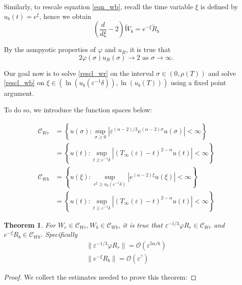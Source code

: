 \documentclass[letterpaper,11pt]{article}
\newcommand{\rmO}{\mathcal{O}}
\newcommand{\eps}{\varepsilon}
\numberwithin{equation}{section}
\theoremstyle{plain}
\newtheorem{theorem}{Theorem}[section]
\begin{document}
\begin{itemize}
Similarly, to rescale equation \eqref{eqn_wb}, recall the time variable $\xi$ is defined by $u_b(t) = e^\xi$, hence we obtain
\begin{equation}\label{rescl_wb}
\left(\frac{d}{d\xi} - 2\right) \tilde{W}_b =e^{-\xi} \tilde{R}_b
\end{equation}


By the asmpyotic properties of $\varphi$ and $u_R$, it is true that
\[
2\varphi(\sigma)u_R(\sigma) \to  2 \text{ as }\sigma \to \infty.
\]

Our goal now is to solve \eqref{rescl_wr} on the interval $\sigma \in (0, \rho(T))$ and solve \eqref{rescl_wb} on $\xi \in (\ln(u_b(\eps^{-1}\delta)), \ln(u_b(T)) )$ using a fixed point argument. 

To do so, we introduce the function spaces below:

\begin{align*}
\mathcal{C}_{Wr} &= \left\{ u(\sigma) : \sup_{\sigma\ge 0} \left|\eps^{(\alpha-2)/3} e^{(\alpha-2)\sigma}u(\sigma)\right| < \infty \right\} \\
&= \left\{ u(t) :\sup_{t \ge \eps^{-1}\delta} \left| (T_\infty(\eps)-t)^{2-\alpha}u(t)\right|<\infty
\right\} \\
\mathcal{C}_{Wb} &= \left\{ u(\xi) : \sup_{e^\xi\ge u_b(\eps^{-1}\delta)} \left| e^{(\alpha-2)\xi}u(\xi)\right| < \infty \right\} \\
 &= \left\{ u(t) : \sup_{t\ge \eps^{-1}\delta} \left| (T_\infty(\eps)-t)^{2-\alpha}u(t)\right| < \infty \right\}
\end{align*}

\begin{theorem}
For $W_r \in \mathcal{C}_{Wr}, W_b \in \mathcal{C}_{Wb}$, it is true that $\eps^{-1/3}\varphi R_r \in \mathcal{C}_{Wr}$ and $e^{-\xi}R_b \in \mathcal{C}_{Wb}$. Specifically
\begin{align}
\|\eps^{-1/3}\varphi R_r \| = \rmO(\eps^{5													\alpha/6})\\
\|e^{-\xi}R_b \| = \rmO(\eps^{?})
\end{align}
\end{theorem}
\begin{proof}
We collect the estimates needed to prove this theorem:


\end{proof}
\end{itemize}
\end{document}
